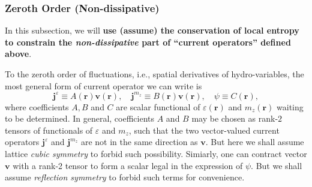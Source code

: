 \documentclass[10pt,nofootinbib]{revtex4}
\begin{document}
		\subsubsection{Zeroth Order (Non-dissipative)}
			In this subsection, we will {\bf use (assume) the conservation of local entropy to constrain the \emph{non-dissipative} part of ``current operators'' defined above}. \par
			To the zeroth order of fluctuations, i.e., spatial derivatives of hydro-variables, the most general form of current operator we can write is
			\begin{equation}\label{2.1.1}
				\bm{j}^\varepsilon\equiv A(\bm{r})\bm{v}(\bm{r}),\quad \bm{j}^{m_z}\equiv B(\bm{r})\bm{v}(\bm{r}),\quad \psi\equiv C(\bm{r}),
			\end{equation}
			where coefficients $A,B$ and $C$ are scalar functional of $\varepsilon(\bm{r})$ and $m_z(\bm{r})$ waiting to be determined. In general, coefficients $A$ and $B$ may be chosen as rank-$2$ tensors of functionals of $\varepsilon$ and $m_z$, such that the two vector-valued current operators $\bm{j}^\varepsilon$ and $\bm{j}^{m_z}$ are not in the same direction as $\bm{v}$. {\color{red}But here we shall assume lattice \emph{cubic symmetry} \cite{halperin1969hydrodynamic} to forbid such possibility}. Simiarly, one can contract vector $\bm{v}$ with a rank-2 tensor to form a scalar legal in the expression of $\psi$. {\color{red}But we shall assume \emph{reflection symmetry} to forbid such terms for convenience}.\par
\end{document}
